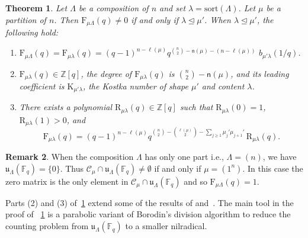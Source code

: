 \documentclass[12pt,a4paper,reqno]{amsart}
\theoremstyle{plain}
\newtheorem{theorem}{Theorem}[section]
\theoremstyle{definition}
\newtheorem{remark}[theorem]{Remark}
\newcommand{\less}{\unlhd}
\newcommand{\ZZ}{{\mathbb{Z}}}
\newcommand{\FF}{{\mathbb{F}}}
\newcommand{\1}{\mathds{1}}
\newcommand{\C}{\mathcal{C}}
\newcommand{\F}{\mathrm{F}}
\newcommand{\K}{{\mathrm{K}}}
\newcommand{\R}{\mathrm{R}}
\renewcommand{\u}{\mathfrak{u}}
\newcommand{\fn}{\mathsf{n}}
\begin{document}
\begin{theorem}\label{mainthm:Fmula-comb} 
Let $\Lambda$ be a composition of $n$ and set $\lambda = \mathrm{sort}(\Lambda)$. Let $\mu$ be a partition of $n$.
Then  
$\F_{\mu\Lambda}(q)\neq 0$ 
if and only if $\lambda \less \mu'$.
 When $\lambda \less \mu'$, the following hold:
\begin{enumerate} \setlength{\itemsep}{5pt}
\item $
\label{Fmula-comb:Formula}
\F_{\mu \Lambda}(q) = \F_{\mu \lambda}(q)=(q-1)^{n-\ell(\mu)}q^{\binom{n}{2}-\fn(\mu)-(n-\ell(\mu))}\,\, b_{\mu'\lambda}(1/q)$.





\item  $\F_{\mu \lambda}(q)\in \ZZ[q]$,  the degree of 
$\F_{\mu \lambda}(q)$
is $\binom{n}{2} - \fn(\mu)$, and its leading coefficient is $\K_{\mu' \lambda}$, the Kostka number of shape $\mu'$ and content $\lambda$.

\item There exists a polynomial  
$\R_{\mu\lambda}(q)\in\mathbb Z[q]$ such that $\R_{\mu\lambda}(0)=1$, $\R_{\mu\lambda}(1)> 0$, and  
\begin{equation}\label{Into:eq_Fuchs-Kirillov}
\F_{\mu\lambda}(q)=(q-1)^{n-\ell(\mu)}q^{\binom{n}{2}-\binom{\ell(\mu)}{2}-\sum_{j\geq 1}\mu_j'\mu_{j+1}'}\, \R_{\mu\lambda}(q).
\end{equation}



\end{enumerate}


\end{theorem}
\begin{remark}\label{Lambda-length} When the composition $\Lambda$ has only one part i.e., $\Lambda=(n)$, we have $\u_\Lambda(\FF_q)=\{0\}$. Thus $\C_\mu\cap \u_\Lambda(\FF_q)\neq \emptyset$ if and only if $\mu=(1^n)$. In this case the zero matrix is the only element in $\C_\mu\cap\u_\Lambda(\FF_q)$ and so $\F_{\mu\Lambda}(q)=1$.
\end{remark}

Parts (2) and (3) of~\cref{mainthm:Fmula-comb} extend some of the results of
\cite{Borodin} and~\cite[Theorem 4.1]{Fuchs-Kirillov}. The main  tool in the proof of ~\cref{mainthm:Fmula-comb} is a parabolic variant of Borodin's division algorithm to reduce the counting problem  from $\u_{\Lambda}(\FF_q)$ to a smaller nilradical. %
\end{document}
